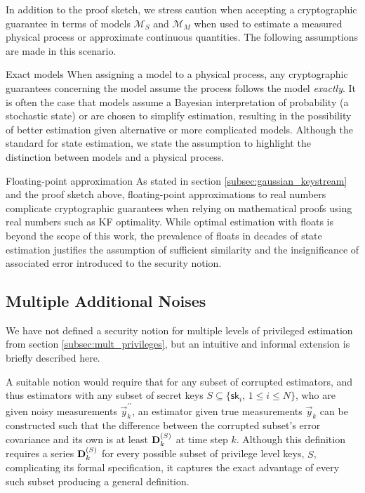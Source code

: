\documentclass[letterpaper, 10 pt, conference]{ieeeconf}
\begin{document}
In addition to the proof sketch, we stress caution when accepting a cryptographic guarantee in terms of models $\mathcal{M}_S$ and $\mathcal{M}_M$ when used to estimate a measured physical process or approximate continuous quantities. The following assumptions are made in this scenario.
\begin{LaTeXdescription}
   \item[Exact models] When assigning a model to a physical process, any cryptographic guarantees concerning the model assume the process follows the model \textit{exactly}. It is often the case that models assume a Bayesian interpretation of probability (a stochastic state) or are chosen to simplify estimation, resulting in the possibility of better estimation given alternative or more complicated models. Although the standard for state estimation, we state the assumption to highlight the distinction between models and a physical process.
   \item[Floating-point approximation] As stated in section \ref{subsec:gaussian_keystream} and the proof sketch above, floating-point approximations to real numbers complicate cryptographic guarantees when relying on mathematical proofs using real numbers such as KF optimality. While optimal estimation with floats is beyond the scope of this work, the prevalence of floats in decades of state estimation justifies the assumption of sufficient similarity and the insignificance of associated error introduced to the security notion.
\end{LaTeXdescription}

% 
% 

\subsection{Multiple Additional Noises}
We have not defined a security notion for multiple levels of privileged estimation from section \ref{subsec:mult_privileges}, but an intuitive and informal extension is briefly described here. 

A suitable notion would require that for any subset of corrupted estimators, and thus estimators with any subset of secret keys $S \subseteq \{\mathsf{sk}_i,\,1\leq i\leq N\}$, who are given noisy measurements $\vec{y}_k^{\prime\prime}$, an estimator given true measurements $\vec{y}_k$ can be constructed such that the difference between the corrupted subset's error covariance and its own is at least ${{\mathbf{D}}}^{(S)}_k$ at time step $k$. Although this definition requires a series ${{\mathbf{D}}}^{(S)}_k$ for every possible subset of privilege level keys, $S$, complicating its formal specification, it captures the exact advantage of every such subset producing a general definition.
\end{document}
